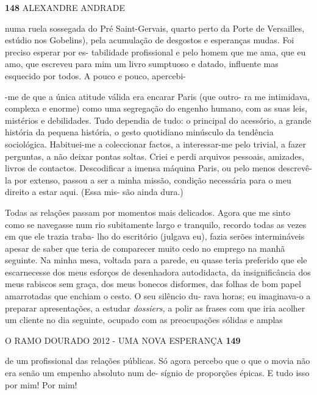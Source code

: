 \textbf{148 }ALEXANDRE ANDRADE

numa ruela sossegada do Pré Saint-Gervais, quarto perto da Porte de
Versailles, estúdio nos Gobelins), pela acumulação de desgostos e
esperanças mudas. Foi preciso esperar por es- tabilidade profissional e
pelo homem que me ama, que eu amo, que escreveu para mim um livro
sumptuoso e datado, influente mas esquecido por todos. A pouco e pouco,
apercebi-

-me de que a única atitude válida era encarar Paris (que outro- ra me
intimidava, complexa e enorme) como uma segregação do engenho humano,
com as suas leis, mistérios e debilidades. Tudo dependia de tudo: o
principal do acessório, a grande história da pequena história, o gesto
quotidiano minúsculo da tendência sociológica. Habituei-me a coleccionar
factos, a interessar-me pelo trivial, a fazer perguntas, a não deixar
pontas soltas. Criei e perdi arquivos pessoais, amizades, livros de
contactos. Descodificar a imensa máquina Paris, ou pelo menos
descrevê-la por extenso, passou a ser a minha missão, condição
necessária para o meu direito a estar aqui. (Essa mis- são ainda dura.)

Todas as relações passam por momentos mais delicados. Agora que me sinto
como se navegasse num rio subitamente largo e tranquilo, recordo todas
as vezes em que ele trazia traba- lho do escritório (julgava eu), fazia
serões intermináveis apesar de saber que teria de comparecer muito cedo
no emprego na manhã seguinte. Na minha mesa, voltada para a parede, eu
quase teria preferido que ele escarnecesse dos meus esforços de
desenhadora autodidacta, da insignificância dos meus rabiscos sem graça,
dos meus bonecos disformes, das folhas de bom papel amarrotadas que
enchiam o cesto. O seu silêncio du- rava horas; eu imaginava-o a
preparar apresentações, a estudar \emph{dossiers, }a polir as frases com
que iria acolher um cliente no dia seguinte, ocupado com as preocupações
sólidas e amplas

O RAMO DOURADO 2012 - UMA NOVA ESPERANÇA \textbf{149}

de um profissional das relações públicas. Só agora percebo que o que o
movia não era senão um empenho absoluto num de- sígnio de proporções
épicas. E tudo isso por mim! Por mim!

